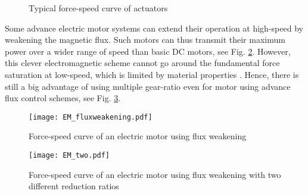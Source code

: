\begin{figure}[htb]
        \centering
        \caption{Typical force-speed curve of actuators}\label{fig:powercurves}
\end{figure}

Some advance electric motor systems can extend their operation at high-speed by weakening the magnetic flux. Such motors can thus transmit their maximum power over a wider range of speed than basic DC motors, see Fig. \ref{fig:EM_fluxweakening}. However, this clever electromagnetic scheme cannot go around the fundamental force saturation at low-speed, which is limited by material properties \cite{hollerbach_comparative_1992}. Hence, there is still a big advantage of using multiple gear-ratio even for motor using advance flux control schemes, see Fig. \ref{fig:EM_two}. 

\begin{figure}[ht]
	\centering
		\texttt{[image: EM\_fluxweakening.pdf]}
	\caption{Force-speed curve of an electric motor using flux weakening }
	\label{fig:EM_fluxweakening}
\end{figure}

\begin{figure}[ht]
	\centering
		\texttt{[image: EM\_two.pdf]}
	\caption[Two-speed electric motor using flux weakening]{Force-speed curve of an electric motor using flux weakening with two different reduction ratios}
	\label{fig:EM_two}
\end{figure}


